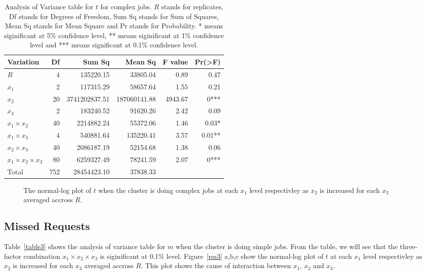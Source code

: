 \documentclass[preprint]{acm_proc_article-sp}
\begin{document}
\begin{table*}
	\caption{Analysis of Variance table for $t$ for complex jobs. $R$ stands for replicates, Df stands for Degrees of Freedom, Sum Sq stands for Sum of Squares, Mean Sq stands for Mean Square and Pr stands for Probability. * means siginificant at 5\% confidence level, ** means siginificant at 1\% confidence level and *** means significant at 0.1\% confidence level.}
	\label{table2}
	\centering
	\begin{tabular}{l|rrrrr}
		\hline\hline
		Variation&Df&Sum Sq&Mean Sq&F value&Pr(>F)\\
		\hline
		$R$&4&135220.15&33805.04&0.89&0.47\\
		$x_1$&2&117315.29&58657.64&1.55&0.21\\
		$x_2$&20&3741202837.51&187060141.88&4943.67&0***\\
		$x_3$&2&183240.52&91620.26&2.42&0.09\\
		$x_1 \times x_2$&40&2214882.24&55372.06&1.46&0.03*\\
		$x_1 \times x_3$&4&540881.64&135220.41&3.57&0.01**\\
		$x_2 \times x_3$&40&2086187.19&52154.68&1.38&0.06\\
		$x_1 \times x_2 \times x_3$&80&6259327.49&78241.59&2.07&0***\\
		\hline
		Total&752&28454423.10&37838.33\\
		\hline\hline
	\end{tabular}
\end{table*}

\begin{figure*}[htb]
        \centering
{}
        \caption{The normal-log plot of $t$ when the cluster is doing complex jobs at each $x_1$ level respectivley as $x_2$ is increased for each $x_3$ averaged accross $R$.}
        \label{res2}
\end{figure*}


\subsection{Missed Requests}
Table~\ref{table3} shows the analysis of variance table for $m$ when the cluster is doing simple jobs. From the table, we will see that the three-factor combination $x_1 \times x_2 \times x_3$ is siginificant at 0.1\% level. Figure~\ref{res3} a,b,c show the normal-log plot of $t$ at each $x_1$ level respectivley as $x_2$ is increased for each $x_3$ averaged accross $R$. This plot shows the cause of interaction between $x_1$, $x_2$ and $x_3$.
\end{document}
